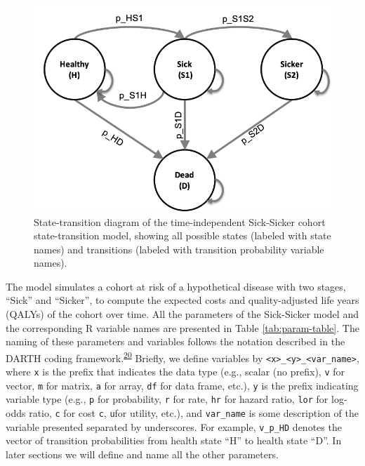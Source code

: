 \documentclass[
]{article}
\begin{document}
\begin{figure}[H]

{\centering \includegraphics[width=10.64in]{figs/Sick-Sicker} 

}

\caption{State-transition diagram of the time-independent Sick-Sicker cohort state-transition model, showing all possible states (labeled with state names) and transitions (labeled with transition probability variable names).}\label{fig:STD-Sick-Sicker}
\end{figure}

The model simulates a cohort at risk of a hypothetical disease with two stages, ``Sick'' and ``Sicker'', to compute the expected costs and quality-adjusted life years (QALYs) of the cohort over time.
All the parameters of the Sick-Sicker model and the corresponding R variable names are presented in Table \ref{tab:param-table}. The naming of these parameters and variables follows the notation described in the DARTH coding framework.\textsuperscript{\protect\hyperlink{ref-Alarid-Escudero2019e}{20}} Briefly, we define variables by \texttt{\textless{}x\textgreater{}\_\textless{}y\textgreater{}\_\textless{}var\_name\textgreater{}}, where \texttt{x} is the prefix that indicates the data type (e.g., scalar (no prefix), \texttt{v} for vector, \texttt{m} for matrix, \texttt{a} for array, \texttt{df} for data frame, etc.), \texttt{y} is the prefix indicating variable type (e.g., \texttt{p} for probability, \texttt{r} for rate, \texttt{hr} for hazard ratio, \texttt{lor} for log-odds ratio, \texttt{c} for cost \texttt{c}, \texttt{u}for utility, etc.), and \texttt{var\_name} is some description of the variable presented separated by underscores. For example, \texttt{v\_p\_HD} denotes the vector of transition probabilities from health state ``H'' to health state ``D''. In later sections we will define and name all the other parameters.
\end{document}
